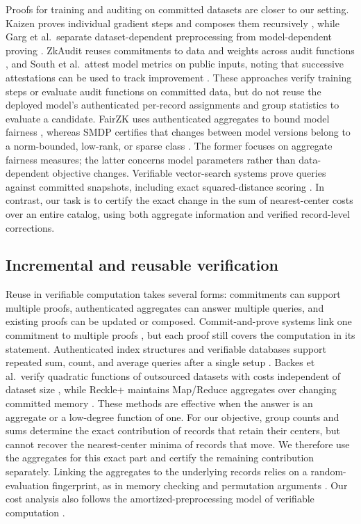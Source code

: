 \documentclass[5p,times,twocolumn]{elsarticle}
\begin{document}
Proofs for training and auditing on committed datasets are closer to
our setting. Kaizen proves individual gradient steps and composes
them recursively \cite{abbaszadeh2024kaizen}, while Garg et al.\
separate dataset-dependent preprocessing from model-dependent
proving \cite{garg2023zkpot}. ZkAudit reuses commitments to data
and weights across audit functions \cite{waiwitlikhit2024zkaudit},
and South et al.\ attest model metrics on public inputs, noting
that successive attestations can be used to track improvement
\cite{south2024verifiable}. These approaches verify training steps
or evaluate audit functions on committed data, but do not reuse
the deployed model's authenticated per-record assignments and
group statistics to evaluate a candidate. FairZK uses authenticated
aggregates to bound model fairness
\cite{zhang2025fairzk}, whereas SMDP certifies that changes between
model versions belong to a norm-bounded, low-rank, or sparse class
\cite{shang2026smdp}. The former focuses on aggregate fairness
measures; the latter concerns model parameters rather than
data-dependent objective changes. Verifiable vector-search systems
prove queries against committed snapshots, including exact
squared-distance scoring \cite{v3db2026,zhang2026verif}. In
contrast, our task is to certify the exact change in the sum of
nearest-center costs over an entire catalog, using both aggregate
information and verified record-level corrections.

\subsection{Incremental and reusable verification}
\label{sec:rw-reuse}

Reuse in verifiable computation takes several forms: commitments
can support multiple proofs, authenticated aggregates can answer
multiple queries, and existing proofs can be updated or composed.
Commit-and-prove systems link one commitment to multiple proofs
\cite{campanelli2019legosnark,artemis2024}, but each proof still
covers the computation in its statement. Authenticated index
structures and verifiable databases support repeated sum, count,
and average queries after a single setup
\cite{li2010authenticated,zhang2015integridb,zhang2017vsql}.
Backes et al.\ verify quadratic functions of outsourced datasets
with costs independent of dataset size
\cite{backes2013verifiable}, while Reckle+ maintains Map/Reduce
aggregates over changing committed memory
\cite{papamanthou2024reckle}. These methods are effective when
the answer is an aggregate or a low-degree function of one.
For our objective, group counts and sums determine the exact
contribution of records that retain their centers, but cannot
recover the nearest-center minima of records that move. We
therefore use the aggregates for this exact part and certify the
remaining contribution separately. Linking the aggregates to
the underlying records relies on a random-evaluation fingerprint,
as in memory checking and permutation arguments
\cite{blum1994checking,gabizon2019plonk}. Our cost analysis
also follows the amortized-preprocessing model of verifiable
computation \cite{gennaro2010noninteractive}.
\end{document}
